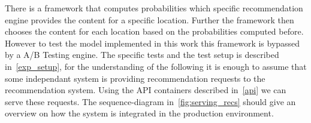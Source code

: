 
There is a framework that computes probabilities which specific recommendation engine provides the content for a specific location.
Further the framework then chooses the content for each location based on the probabilities computed before.
However to test the model implemented in this work this framework is bypassed by a A/B Testing engine.
The specific tests and the test setup is described in~\ref{exp_setup}, for the understanding of the following it is enough to assume that some independant system is providing recommendation requests to the recommendation system.
Using the API containers described in~\ref{api} we can serve these requests.
The sequence-diagram in~\ref{fig:serving_recs} should give an overview on how the system is integrated in the production environment.

